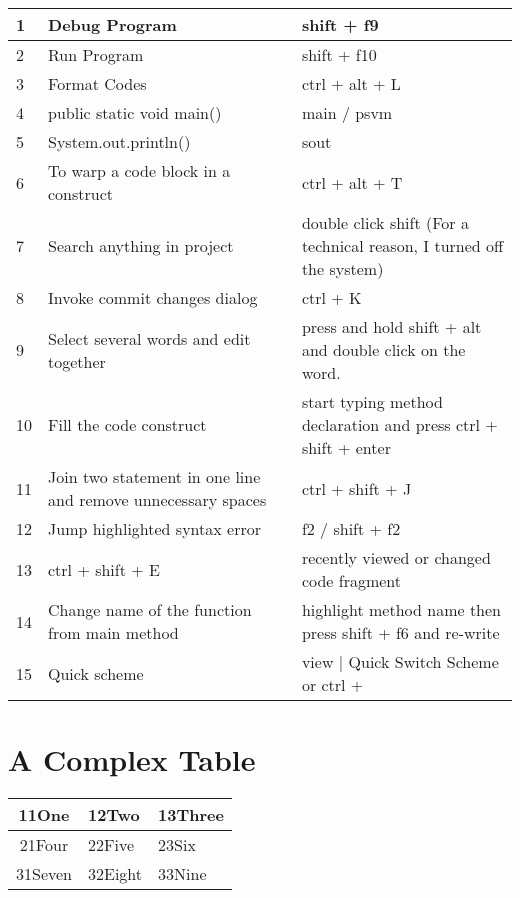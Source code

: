 \documentclass[11 pt]{article}
\begin{document}
\begin{center}
	\begin{longtable}{|| m{2.1 em} || m{15 em} m{17 em} ||}
		\hline\hline
		1 & Debug Program & shift + f9\\
		\hline
		2 & Run Program & shift + f10\\
		\hline
		3 & Format Codes & ctrl + alt + L\\
		\hline
		4 & public static void main() & main / psvm\\
		\hline
		5 & System.out.println() & sout\\
		\hline
		6 & To warp a code block in a construct & ctrl + alt + T\\
		\hline
		7 & Search anything in project & double click shift (For a technical reason, I turned off the system)\\
		\hline
		8 & Invoke commit changes dialog & ctrl + K\\
		\hline
		9 & Select several words and edit together & press and hold shift + alt and double click on the word.\\
		\hline
		10 & Fill the code construct & start typing method declaration and press ctrl + shift + enter\\
		\hline
		11 & Join two statement in one line and remove unnecessary spaces & ctrl + shift + J\\
		\hline
		12 & Jump highlighted syntax error & f2 / shift + f2\\
		\hline
		13 & ctrl + shift + E & recently viewed or changed code fragment\\
		\hline
		14 & Change name of the function from main method & highlight method name then press shift + f6 and re-write\\
		\hline
		15 & Quick scheme & view | Quick Switch Scheme or ctrl +  \\
		\hline\hline
	\end{longtable}
\end{center}


\section*{A Complex Table}

\begin{tabular}{| c | l | l |}

	\hline
	11One & 12Two & 13Three\\
	\hline
	21Four & 22Five & 23Six\\
	\cline{1-1}
	31Seven & 32Eight & 33Nine\\
	\hline

\end{tabular}
\end{document}
